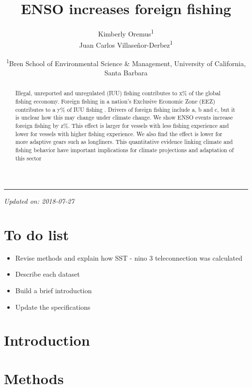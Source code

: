 \documentclass[]{article}
\title{ENSO increases foreign fishing}
\author{Kimberly Oremus\textsuperscript{1} \\ Juan Carlos Villaseñor-Derbez\textsuperscript{1}}
\date{\textsuperscript{1}Bren School of Environmental Science \& Management,
University of California, Santa Barbara}
\providecommand{\tightlist}{%
  \setlength{\itemsep}{0pt}\setlength{\parskip}{0pt}}
\begin{document}
\maketitle
\begin{abstract}
Illegal, unreported and unregulated (IUU) fishing contributes to x\% of
the global fishing ecconomy. Foreign fishing in a nation's Exclusive
Economic Zone (EEZ) contributes to a y\% of IUU fishing
\citep{cabral_2018}. Drivers of foreign fishing include a, b and c, but
it is unclear how this may change under climate change. We show ENSO
events increase foreign fishing by z\%. This effect is larger for
vessels with less fishing experience and lower for vessels with higher
fishing experience. We also find the effect is lower for more adaptive
gears such as longliners. This quantitative evidence linking climate and
fishing behavior have important implications for climate projections and
adaptation of this sector
\end{abstract}

{
\setcounter{tocdepth}{4}
\tableofcontents
}
\begin{center}\rule{0.5\linewidth}{\linethickness}\end{center}

\emph{Updated on: 2018-07-27}

\section{To do list}\label{to-do-list}

\begin{itemize}
\tightlist
\item
  Revise methods and explain how SST - nino 3 teleconnection was
  calculated
\item
  Describe each dataset
\item
  Build a brief introduction
\item
  Update the specifications
\end{itemize}

\clearpage

\section{Introduction}\label{introduction}

\section{Methods}\label{methods}
\end{document}
